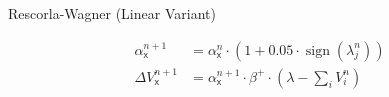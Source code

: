\documentclass[border=10pt,varwidth]{standalone}
\begin{document}
\begin{center}
	\huge
	\sffamily
	Rescorla-Wagner (Linear Variant)
\end{center}
\newcommand{\eks}{\textsf{x}}
\begin{equation*}
	\begin{aligned}
		\alpha_\eks^{n + 1} &= \alpha_\eks^n \cdot (1 + 0.05 \cdot \operatorname{sign}(\lambda_j^n)) \\
		\Delta V_{\eks}^{n+1} &= \alpha_\eks^{n + 1} \cdot \beta^+ \cdot \left( \lambda - \textstyle\sum_i V_i^{n} \right)
	\end{aligned}
	\label{linear_alpha}
\end{equation*}
\end{document}
